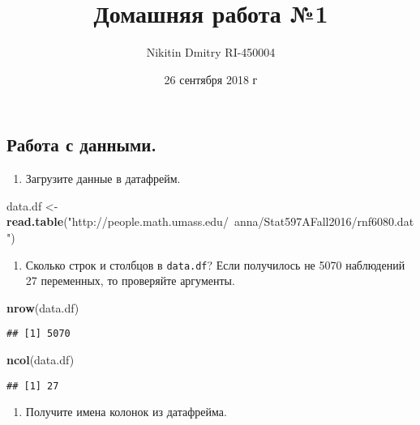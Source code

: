 \documentclass[]{article}
\title{Домашняя работа №1}
\author{Nikitin Dmitry RI-450004}
\date{26 сентября 2018 г}
\newenvironment{Shaded}{\begin{snugshade}}{\end{snugshade}}
\newcommand{\KeywordTok}[1]{\textcolor[rgb]{0.13,0.29,0.53}{\textbf{#1}}}
\newcommand{\StringTok}[1]{\textcolor[rgb]{0.31,0.60,0.02}{#1}}
\newcommand{\NormalTok}[1]{#1}
\providecommand{\tightlist}{%
  \setlength{\itemsep}{0pt}\setlength{\parskip}{0pt}}
\begin{document}
\maketitle

\subsection{Работа с данными.}\label{--.}

\begin{enumerate}
\def\labelenumi{\arabic{enumi}.}
\tightlist
\item
  Загрузите данные в датафрейм.
\end{enumerate}

\begin{Shaded}
\begin{Highlighting}[]
\NormalTok{data.df <-}\StringTok{ }\KeywordTok{read.table}\NormalTok{(}\StringTok{"http://people.math.umass.edu/~anna/Stat597AFall2016/rnf6080.dat"}\NormalTok{)}
\end{Highlighting}
\end{Shaded}

\begin{enumerate}
\def\labelenumi{\arabic{enumi}.}
\setcounter{enumi}{1}
\tightlist
\item
  Сколько строк и столбцов в \texttt{data.df}? Если получилось не 5070
  наблюдений 27 переменных, то проверяйте аргументы.
\end{enumerate}

\begin{Shaded}
\begin{Highlighting}[]
\KeywordTok{nrow}\NormalTok{(data.df)}
\end{Highlighting}
\end{Shaded}

\begin{verbatim}
## [1] 5070
\end{verbatim}

\begin{Shaded}
\begin{Highlighting}[]
\KeywordTok{ncol}\NormalTok{(data.df)}
\end{Highlighting}
\end{Shaded}

\begin{verbatim}
## [1] 27
\end{verbatim}

\begin{enumerate}
\def\labelenumi{\arabic{enumi}.}
\setcounter{enumi}{2}
\tightlist
\item
  Получите имена колонок из датафрейма.
\end{enumerate}
\end{document}
